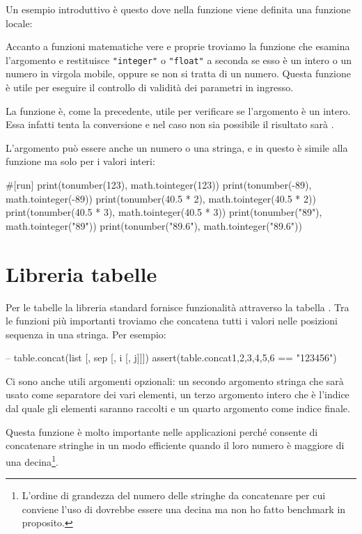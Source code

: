 Un esempio introduttivo è questo dove nella funzione  viene definita una
funzione locale:

Accanto a funzioni matematiche vere e proprie troviamo la funzione
 che esamina l'argomento e restituisce
\verb|"integer"| o \verb|"float"| a seconda se esso è un intero o un numero in
virgola mobile, oppure  se non si tratta di un numero. Questa funzione
è utile per eseguire il controllo di validità dei parametri in ingresso.

La funzione  è, come la precedente,
utile per verificare se l'argomento è un intero. Essa infatti tenta la
conversione e nel caso non sia possibile il risultato sarà . 

L'argomento può essere anche un numero o una stringa, e in questo è simile alla
funzione  ma solo per i valori interi:
\begin{lines}
#[run]
print(tonumber(123), math.tointeger(123))
print(tonumber(-89), math.tointeger(-89))
print(tonumber(40.5 * 2), math.tointeger(40.5 * 2))
print(tonumber(40.5 * 3), math.tointeger(40.5 * 3))
print(tonumber("89"), math.tointeger("89"))
print(tonumber("89.6"), math.tointeger("89.6"))
\end{lines}


\section{Libreria tabelle}

Per le tabelle la libreria standard fornisce funzionalità attraverso la tabella
. Tra le funzioni più importanti troviamo
 che concatena tutti i valori nelle
posizioni sequenza in una stringa. Per esempio:
\begin{lines}
-- table.concat(list [, sep [, i [, j]]])
assert(table.concat{1,2,3,4,5,6} == "123456")
\end{lines}

Ci sono anche utili argomenti opzionali: un secondo argomento stringa che sarà
usato come separatore dei vari elementi, un terzo argomento intero che è
l'indice dal quale gli elementi saranno raccolti e un quarto argomento come
indice finale.

Questa funzione è molto importante nelle applicazioni perché consente di
concatenare stringhe in un modo efficiente quando il loro numero è maggiore di
una decina\footnote{L'ordine di grandezza del numero delle stringhe da
concatenare per cui conviene l'uso di  dovrebbe essere una
decina ma non ho fatto benchmark in proposito.}.

